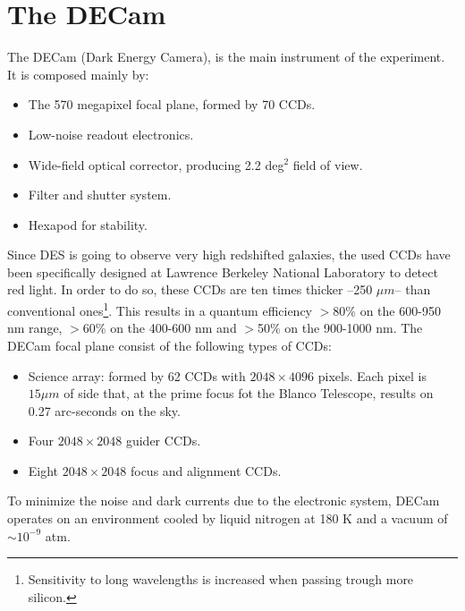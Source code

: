 \section{The DECam}
The DECam (Dark Energy Camera), is the main instrument of the experiment. It is composed mainly by:
\begin{itemize}
	\item The 570 megapixel focal plane, formed by 70 CCDs.
    \item Low-noise readout electronics.
    \item Wide-field optical corrector, producing 2.2 deg$^2$ field of view.
    \item Filter and shutter system.
    \item Hexapod for stability.   
\end{itemize}
Since DES is going to observe very high redshifted galaxies, the used CCDs have been specifically designed at Lawrence Berkeley National Laboratory to detect red light. In order to do so, these CCDs are ten times thicker --250 $\mu m$-- than conventional ones\footnote{Sensitivity to long wavelengths is increased when passing trough more silicon.}. This results in a quantum efficiency $>$80\% on the 600-950 nm range, $>$60\% on the 400-600 nm and $>$50\% on the 900-1000 nm. The DECam focal plane consist of the following types of CCDs:
\begin{itemize}
\item Science array: formed by 62 CCDs with $2048\times 4096$ pixels. Each pixel is $15\mu m$ of side that, at the prime focus fot the  Blanco Telescope, results on 0.27 arc-seconds on the sky.
\item Four $2048\times2048$ guider CCDs.
\item Eight $2048\times 2048$ focus and alignment CCDs.
\end{itemize}
To minimize the noise and dark currents due to the electronic system, DECam operates on an environment cooled by liquid nitrogen at 180 K and a vacuum of $\sim 10^{-9}$ atm.
\newline

